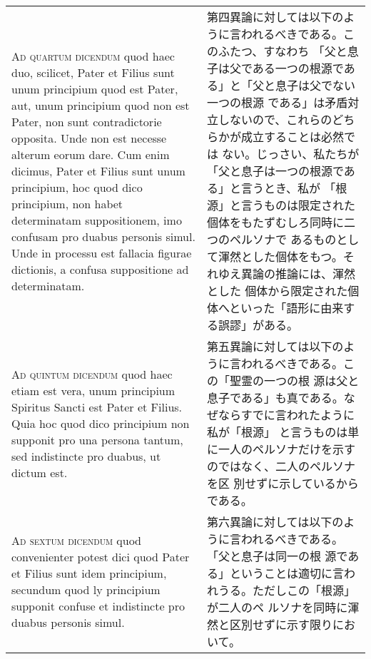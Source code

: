 \documentclass[10pt]{jsarticle} %
\begin{document}
\begin{longtable}{p{21em}p{21em}}
\\



{\scshape Ad quartum dicendum} quod haec duo, scilicet, Pater et Filius sunt unum
principium quod est Pater, aut, unum principium quod non est Pater,
non sunt contradictorie opposita. Unde non est necesse alterum eorum
dare. Cum enim dicimus, Pater et Filius sunt unum principium, hoc quod
dico principium, non habet determinatam suppositionem, imo confusam
pro duabus personis simul. Unde in processu est fallacia figurae
dictionis, a confusa suppositione ad determinatam.

&

第四異論に対しては以下のように言われるべきである。このふたつ、すなわち
「父と息子は父である一つの根源である」と「父と息子は父でない一つの根源
である」は矛盾対立しないので、これらのどちらかが成立することは必然では
ない。じっさい、私たちが「父と息子は一つの根源である」と言うとき、私が
「根源」と言うものは限定された個体をもたずむしろ同時に二つのペルソナで
あるものとして渾然とした個体をもつ。それゆえ異論の推論には、渾然とした
個体から限定された個体へといった「語形に由来する誤謬」がある。


\\



{\scshape Ad quintum dicendum} quod haec etiam est vera, unum principium
Spiritus Sancti est Pater et Filius. Quia hoc quod dico principium non
supponit pro una persona tantum, sed indistincte pro duabus, ut dictum
est.

&

第五異論に対しては以下のように言われるべきである。この「聖霊の一つの根
源は父と息子である」も真である。なぜならすでに言われたように私が「根源」
と言うものは単に一人のペルソナだけを示すのではなく、二人のペルソナを区
別せずに示しているからである。



\\



{\scshape Ad sextum dicendum} quod convenienter potest dici quod Pater et Filius
sunt idem principium, secundum quod ly principium supponit confuse et
indistincte pro duabus personis simul.

&

第六異論に対しては以下のように言われるべきである。「父と息子は同一の根
 源である」ということは適切に言われうる。ただしこの「根源」が二人のペ
 ルソナを同時に渾然と区別せずに示す限りにおいて。



\end{longtable}
\end{document}
